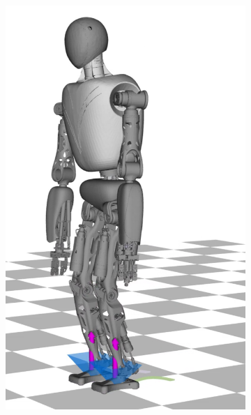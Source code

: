 \begin{figure}
\begin{subfigure}{.16\textwidth}
	\includegraphics[width=1\linewidth]{fig/walkDynamic/snaps/7}
	\caption{}
\end{subfigure}%
\begin{subfigure}{.16\textwidth}

\end{subfigure}
\end{figure}
